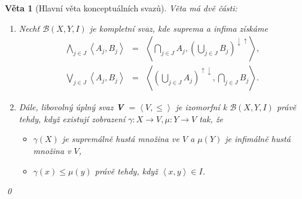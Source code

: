 \documentclass[12pt]{article}
\newcommand{\addk}[1]{\left(#1\right)}
\newcommand{\adds}[1]{\left\{#1\right\}}
\newcommand{\addsp}[1]{\left<#1\right>}
\DeclareMathOperator{\fix}{fix}
\DeclareMathOperator{\ext}{Ext}
\DeclareMathOperator{\intfca}{Int}
\newcommand{\lattice}{\mathcal{B}(X, Y, I)}
\newcommand{\updown}{^{\uparrow\downarrow}}
\newcommand{\downup}{^{\downarrow\uparrow}}
\newcommand{\biginf}{\bigwedge}
\newcommand{\bigsup}{\bigvee}
\newtheorem{theorem}[mydef]{Věta}
\begin{document}
\begin{theorem}[Hlavní věta konceptuálních svazů]
Věta má dvě části:
\begin{enumerate}
	\item Nechť $\lattice$ je kompletní svaz, kde suprema a infima získáme
	\begin{eqnarray}
	\biginf_{j\in J}\addsp{A_j, B_j}&=&\addsp{\bigcap_{j\in J}A_j, \addk{\bigcup_{j\in J}B_j}\downup},\label{eq.main1}\\
	\bigsup_{j\in J}\addsp{A_j, B_j}&=&\addsp{\addk{\bigcup_{j\in J}A_j}\updown,\bigcap_{j\in J}B_j}.
	\end{eqnarray}
	\item Dále, libovolný úplný svaz \textbf{V} $=\addsp{V,\le}$ je izomorfní k $\lattice$ právě tehdy, když existují zobrazení $\gamma: X\rightarrow V, \mu:Y\rightarrow V$ tak, že
	\begin{itemize}
		\item $\gamma(X)$ je supremálně hustá množina ve $V$ a $\mu(Y)$ je infimálně hustá množina v $V$,
		\item $\gamma(x)\le\mu(y)$ právě tehdy, když $\addsp{x,y}\in I$.
	\end{itemize}
\end{enumerate}
\qed\end{theorem}




\end{document}
